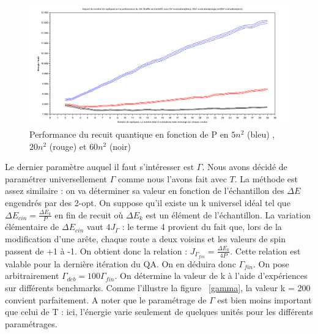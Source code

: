 \documentclass{article}%
\begin{document}
	\begin{figure}[!h]
	\begin{center}
	\includegraphics[scale=0.25]{berlin52_nbRepliques.png}
	\caption{Performance du recuit quantique en fonction de P en $ 5n^2 $ (bleu) , $ 20n^2 $ (rouge) et $ 60n^2 $ (noir)}
	\label{berlin52_nbRepliques}
	\end{center}
	\end{figure}
	
	\vspace{1cm}
	
	Le dernier paramètre auquel il faut s'intéresser est $ \Gamma $. Nous avons décidé de paramétrer universellement $ \Gamma $ comme nous l'avons fait avec $ T $. La méthode est assez similaire : on va déterminer sa valeur en fonction de l'échantillon des $ \Delta E $ engendrés par des 2-opt. On suppose qu'il existe un k universel idéal tel que $ \Delta E_{cin} = \frac{\Delta E_{k}}{P} $ en fin de recuit où $ \Delta E_{k} $ est un élément de l'échantillon. La variation élémentaire de $ \Delta E_{cin} $ vaut $ 4J_{\Gamma} $ : le terme 4 provient du fait que, lors de la modification d'une arête, chaque route a deux voisins et les valeurs de spin passent de +1 à -1. On obtient donc la relation : $ J_{\Gamma_{fin}} = \frac{\Delta E_{k}}{4P} $. Cette relation est valable pour la dernière itération du QA. On en déduira donc $ \Gamma_{fin} $. On pose arbitrairement $ \Gamma_{deb} = 100\Gamma_{fin} $. 
	On détermine la valeur de k à l'aide d'expériences sur différents benchmarks. Comme l'illustre la figure ~\ref{gamma}, la valeur k = 200 convient parfaitement. A noter que le paramétrage de $ \Gamma $ est bien moins important que celui de T : ici, l'énergie varie seulement de quelques unités pour les différents paramétrages.
	
\end{document}
